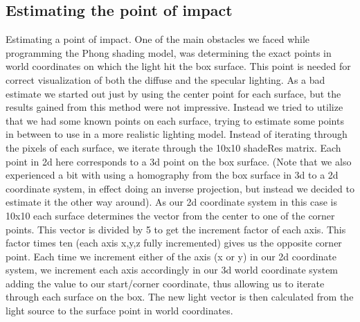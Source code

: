 \subsection{Estimating the point of impact}
Estimating a point of impact. 
One of the main obstacles we faced while programming the Phong shading model, was determining the exact points in world coordinates on which the light hit the box surface. This point is needed for correct visualization of both the diffuse and the specular lighting. As a bad estimate we started out just by using the center point for each surface, but the results gained from this method were not impressive. Instead we tried to utilize that we had some known points on each surface, trying to estimate some points in between to use in a more realistic lighting model. 
Instead of iterating through the pixels of each surface, we iterate through the 10x10 shadeRes matrix. Each point in 2d here corresponds to a 3d point on the box surface. (Note that we also experienced a bit with using a homography from the box surface in 3d to a 2d coordinate system, in effect doing an inverse projection, but instead we decided to estimate it the other way around).
As our 2d coordinate system in this case is 10x10  each surface determines the vector from the center to one of the corner points. This vector is divided by 5 to get the increment factor of each axis. This factor times ten (each axis x,y,z fully incremented) gives us the opposite corner point. Each time we increment either of the axis (x or y) in  our 2d coordinate system, we increment each axis accordingly in our 3d world coordinate system adding the value to our start/corner coordinate, thus allowing us to iterate through each surface on the box. The new light vector is then calculated from the light source to the surface point in world coordinates. 